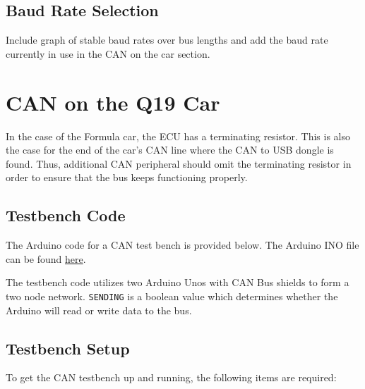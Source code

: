 \documentclass[letterpaper]{article}
\begin{document}
\subsection{Baud Rate Selection}
Include graph of stable baud rates over bus lengths and add the baud rate
currently in use in the CAN on the car section.

\section{CAN on the Q19 Car}
In the case of the Formula car, the ECU has a terminating resistor. This is also the case for
the end of the car's CAN line where the CAN to USB dongle is found. Thus,
additional CAN peripheral should omit the terminating resistor in order to
ensure that the bus keeps functioning properly.

\subsection{Testbench Code}
The Arduino code for a CAN test bench is provided below. The Arduino INO file can be
found
\href{https://github.com/bchampp/Q20/blob/master/CAN/testbench/testbench.ino}{here}.



\lstset{basicstyle=\ttfamily}

The testbench code utilizes two Arduino Unos with CAN Bus shields to form a
two node network. \lstinline{SENDING} is a boolean value which determines whether the
Arduino will read or write data to the bus.

\subsection{Testbench Setup}
\label{sec:setup}
To get the CAN testbench up and running, the following items are required:
\end{document}
